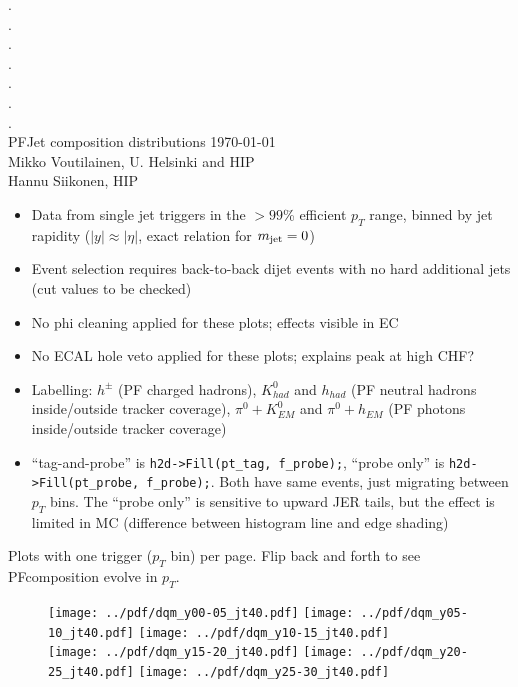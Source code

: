 \documentclass[landscape,10pt]{beamer} %
\begin{document}
\begin{centering}
{. }\\
{. }\\
{. }\\
{. }\\
{. }\\
{. }\\
{. }\\
PFJet composition distributions
\today\\
Mikko Voutilainen, U. Helsinki and HIP\\
Hannu Siikonen, HIP\\
\end{centering}

\newpage

\begin{itemize}
\item Data from single jet triggers in the $>99$\% efficient $p_T$ range, binned by jet rapidity ($|y|\approx |\eta|$, exact relation for $m_{\rm jet}=0$)
\item Event selection requires back-to-back dijet events with no hard additional jets (cut values to be checked)
\item No phi cleaning applied for these plots; effects visible in EC
\item No ECAL hole veto applied for these plots; explains peak at high CHF?
\item Labelling: $h^{\pm}$ (PF charged hadrons), $K^{0}_{had}$ and $h_{had}$ (PF neutral hadrons inside/outside tracker coverage), $\pi^{0}+K^{0}_{EM}$ and $\pi^{0}+h_{EM}$ (PF photons inside/outside tracker coverage)
\item ``tag-and-probe'' is \verb|h2d->Fill(pt_tag, f_probe);|, ``probe only'' is \verb|h2d->Fill(pt_probe, f_probe);|. Both have same events, just migrating between $p_T$ bins. The ``probe only'' is sensitive to upward JER tails, but the effect is limited in MC (difference between histogram line and edge shading)
\end{itemize}

\newpage

Plots with one trigger ($p_T$ bin) per page. Flip back and forth to see PFcomposition evolve in $p_T$.

\newpage

\begin{figure}[p]
\centering
\texttt{[image: ../pdf/dqm\_y00-05\_jt40.pdf]}
\texttt{[image: ../pdf/dqm\_y05-10\_jt40.pdf]}
\texttt{[image: ../pdf/dqm\_y10-15\_jt40.pdf]}\\
\texttt{[image: ../pdf/dqm\_y15-20\_jt40.pdf]}
\texttt{[image: ../pdf/dqm\_y20-25\_jt40.pdf]}
\texttt{[image: ../pdf/dqm\_y25-30\_jt40.pdf]}
\end{figure}
\end{document}
